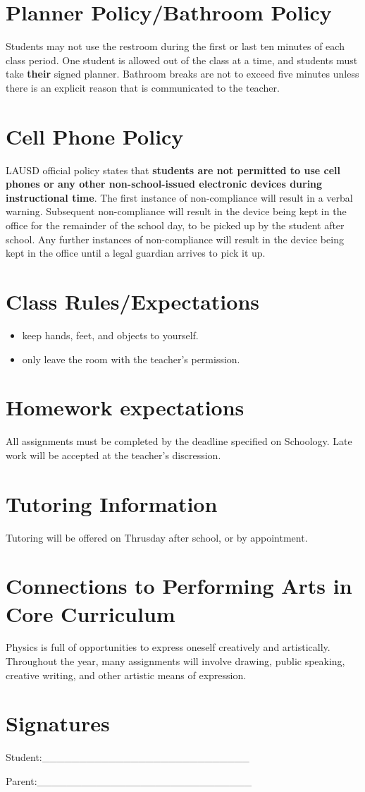 \documentclass[11pt]{article}
\begin{document}
\section{Planner Policy/Bathroom Policy}
\label{sec:org7161c85}
Students may not use the restroom during the first or last ten minutes of each class period. One student is allowed out of the class at a time, and students must take \textbf{\textbf{their}} signed planner. Bathroom breaks are not to exceed five minutes unless there is an explicit reason that is communicated to the teacher.
\section{Cell Phone Policy}
\label{sec:orgdf38493}
LAUSD official policy states that \textbf{\textbf{students are not permitted to use cell phones or any other non-school-issued electronic devices during instructional time}}. The first instance of non-compliance will result in a verbal warning. Subsequent non-compliance will result in  the device being kept in the office for the remainder of the school day, to be picked up by the student after school. Any further instances of non-compliance will result in the device being kept in the office until a legal guardian arrives to pick it up.
\section{Class Rules/Expectations}
\label{sec:orgdc1bf8f}
\begin{itemize}
\item keep hands, feet, and objects to yourself.
\item only leave the room with the teacher's permission.
\end{itemize}
\section{Homework expectations}
\label{sec:org6b59abd}
All assignments must be completed by the deadline specified on Schoology. Late work will be accepted at the teacher's discression. 
\section{Tutoring Information}
\label{sec:org62796f8}
Tutoring will be offered on Thrusday after school, or by appointment.
\section{Connections to Performing Arts in Core Curriculum}
\label{sec:orgfae418a}
Physics is full of opportunities to express oneself creatively and artistically. Throughout the year, many assignments will involve drawing, public speaking, creative writing, and other artistic means of expression.

\section{Signatures}
\label{sec:orge3dc5e9}

Student:\_\_\_\_\_\_\_\_\_\_\_\_\_\_\_\_\_\_\_\_\_\_\_\_\_\_\_\_


Parent:\_\_\_\_\_\_\_\_\_\_\_\_\_\_\_\_\_\_\_\_\_\_\_\_\_\_\_\_\_
\end{document}
